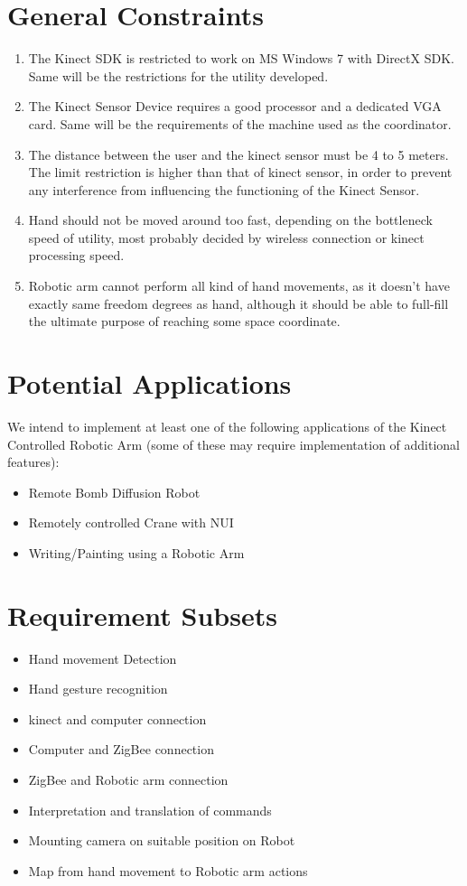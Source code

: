 \documentclass[a4wide]{scrreprt}
\begin{document}
\section{General Constraints}

\begin{enumerate}
\item The Kinect SDK is restricted to work on MS Windows 7 with DirectX SDK. Same will be the restrictions for the utility developed.
\item The Kinect Sensor Device requires a good processor and a dedicated VGA card. Same will be the requirements of the machine used as the coordinator.
\item The distance between the user and the kinect sensor must be 4 to 5 meters. The limit restriction is higher than that of kinect sensor, in order to prevent any interference from influencing the functioning of the Kinect Sensor. 
\item Hand should not be moved around too fast, depending on the bottleneck speed of utility, most probably decided by wireless connection or kinect processing speed.
\item Robotic arm cannot perform all kind of hand movements, as it doesn't have exactly same freedom degrees as hand, although it should be able to full-fill the ultimate purpose of reaching some space coordinate.
\end{enumerate}
\section{Potential Applications}
We intend to implement at least one of the following applications of the Kinect Controlled Robotic Arm (some of these may require implementation of additional features):
\begin{itemize}
\item Remote Bomb Diffusion Robot
\item Remotely controlled Crane with NUI
\item Writing/Painting using a Robotic Arm
\end{itemize}

 


\section{Requirement Subsets}

\begin{itemize}
\item Hand movement Detection
\item Hand gesture recognition
\item kinect and computer connection
\item Computer and ZigBee connection
\item ZigBee and Robotic arm connection
\item Interpretation and translation of commands
\item Mounting camera on suitable position on Robot
\item Map from hand movement to Robotic arm actions
\end{itemize}
\end{document}
